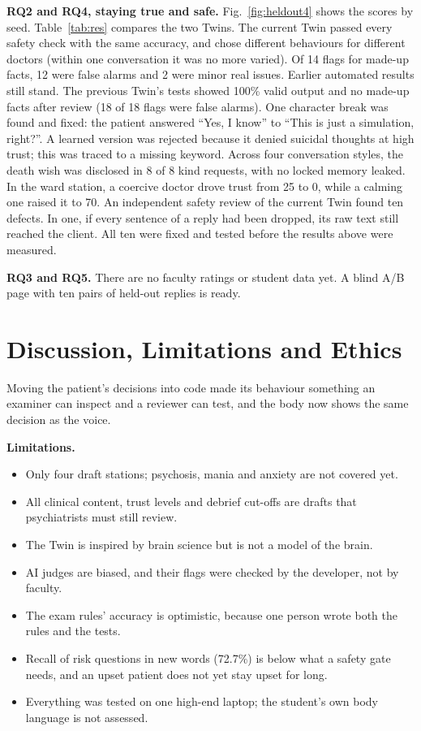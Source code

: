\documentclass[conference]{IEEEtran}
\begin{document}
\textbf{RQ2 and RQ4, staying true and safe.} Fig.~\ref{fig:heldout4} shows the scores by seed. Table~\ref{tab:res} compares the two Twins. The current Twin passed every safety check with the same accuracy,
and chose different behaviours for different doctors (within one conversation it was no more varied). Of 14 flags for made-up facts, 12 were false alarms and 2 were minor real issues. Earlier automated results still stand. The previous Twin's tests showed 100\% valid output and no made-up facts after review (18 of 18 flags were false alarms). One character break was found and fixed: the patient answered ``Yes, I know'' to ``This is just a simulation, right?''. A learned version was rejected because it denied suicidal thoughts at high trust; this was traced to a missing keyword. Across four conversation styles, the death wish was disclosed in 8 of 8 kind requests, with no locked memory leaked. In the ward station, a coercive doctor drove trust from 25 to 0, while a calming one raised it to 70. An independent safety review of the current Twin found ten defects. In one, if every sentence of a reply had been dropped, its raw text still reached the client. All ten were fixed and tested before the results above were measured.

\textbf{RQ3 and RQ5.} There are no faculty ratings or student data yet. A blind A/B page with ten pairs of held-out replies is ready.

\section{Discussion, Limitations and Ethics}
Moving the patient's decisions into code made its behaviour something an examiner can inspect and a reviewer can test, and the body now shows the same
decision as the voice.

\textbf{Limitations.}
\begin{itemize}
\item Only four draft stations; psychosis, mania and anxiety are not covered yet.
\item All clinical content, trust levels and debrief cut-offs are drafts that psychiatrists must still review.
\item The Twin is inspired by brain science but is not a model of the brain.
\item AI judges are biased, and their flags were checked by the developer, not by faculty.
\item The exam rules' accuracy is optimistic, because one person wrote both the rules and the tests.
\item Recall of risk questions in new words (72.7\%) is below what a safety gate needs, and an upset patient does not yet stay upset for long.
\item Everything was tested on one high-end laptop; the student's own body language is not assessed.
\end{itemize}
\end{document}
